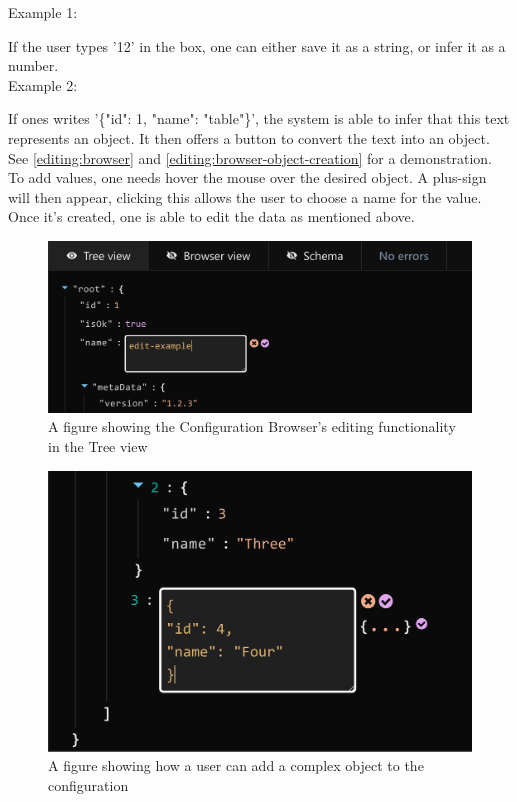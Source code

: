 \noindent 
Example 1:

\noindent 
If the user types '12' in the box, one can either save it as a string, or infer it as a number.\\


\noindent 
Example 2:

\noindent 
If ones writes '\{"id": 1,
"name": "table"\}', the system is able to infer that this text represents an object. It then offers a button to convert the text into an object. See \autoref{editing:browser} and \autoref{editing:browser-object-creation} for a demonstration. \\

\noindent
To add values, one needs hover the mouse over the desired object. A plus-sign will then appear, clicking this allows the user to choose a name for the value. Once it's created, one is able to edit the data as mentioned above. 

\begin{figure}[!ht]
   \begin{minipage}{1\textwidth}
     \centering
     \includegraphics[width=.95\textwidth]{Figures/browser/editing-crop-crop.pdf}
     \caption[Tree view - Edit field]{A figure showing the Configuration Browser’s editing functionality in the Tree view}
     \label{editing:browser}
   \end{minipage}\hfill
\end{figure}

\begin{figure}[!ht]
   \begin{minipage}{1\textwidth}
     \centering
     \includegraphics[width=.95\textwidth]{Figures/browser/editing-object-creation-crop-crop.pdf}
     \caption[Adding a complex object]{A figure showing how a user can add a complex object to the configuration}
     \label{editing:browser-object-creation}
   \end{minipage}\hfill
\end{figure}

